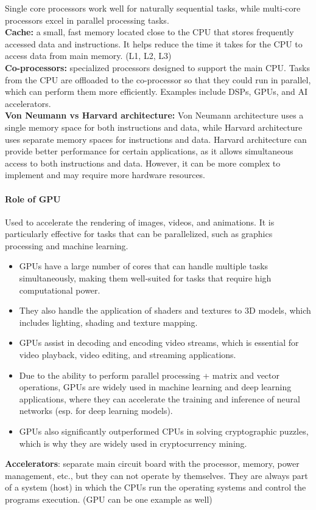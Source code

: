 \documentclass[a4paper,12pt]{article}
\begin{document}
Single core processors work well for naturally sequential tasks, while multi-core processors excel in parallel processing tasks.\\
\textbf{Cache:} a small, fast memory located close to the CPU that stores frequently accessed data and instructions. It helps reduce the time it takes for the CPU to access data from main memory. (L1, L2, L3)\\
\textbf{Co-processors:} specialized processors designed to support the main CPU. Tasks from the CPU are offloaded to the co-processor so that they could run in parallel, which can perform them more efficiently. Examples include DSPs, GPUs, and AI accelerators.\\
\textbf{Von Neumann vs Harvard architecture:} Von Neumann architecture uses a single memory space for both instructions and data, while Harvard architecture uses separate memory spaces for instructions and data. Harvard architecture can provide better performance for certain applications, as it allows simultaneous access to both instructions and data. However, it can be more complex to implement and may require more hardware resources.
\paragraph{Role of GPU}
Used to accelerate the rendering of images, videos, and animations. It is particularly effective for tasks that can be parallelized, such as graphics processing and machine learning. 
\begin{itemize}
    \item GPUs have a large number of cores that can handle multiple tasks simultaneously, making them well-suited for tasks that require high computational power.
    \item They also handle the application of shaders and textures to 3D models, which includes lighting, shading and texture mapping. 
    \item GPUs assist in decoding and encoding video streams, which is essential for video playback, video editing, and streaming applications.
    \item Due to the ability to perform parallel processing + matrix and vector operations, GPUs are widely used in machine learning and deep learning applications, where they can accelerate the training and inference of neural networks (esp. for deep learning models).
    \item GPUs also significantly outperformed CPUs in solving cryptographic puzzles, which is why they are widely used in cryptocurrency mining.
\end{itemize} 
\textbf{Accelerators}: separate main circuit board with the processor, memory, power management, etc., but they can not operate by themselves. They are always part of a system (host) in which the CPUs run the operating systems and control the programs execution. (GPU can be one example as well)
\end{document}
